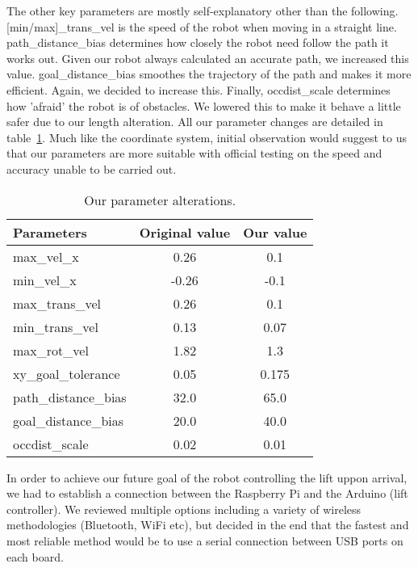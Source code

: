 \documentclass{article}
\begin{document}
The other key parameters are mostly self-explanatory other than the following. [min/max]\_trans\_vel is the speed of the robot when moving in a straight line. path\_distance\_bias determines how closely the robot need follow the path it works out. Given our robot always calculated an accurate path, we increased this value. goal\_distance\_bias smoothes the trajectory of the path and makes it more efficient. Again, we decided to increase this. Finally, occdist\_scale determines how 'afraid' the robot is of obstacles. We lowered this to make it behave a little safer due to our length alteration. All our parameter changes are detailed in table~\ref{tab:params}. Much like the coordinate system, initial observation would suggest to us that our parameters are more suitable with official testing on the speed and accuracy unable to be carried out.

\begin{table}[h]
\vskip 3mm
\begin{center}
\begin{small}
\begin{sc}
\begin{tabular}{lcc}
\hline
\abovespace\belowspace
Parameters & Original value & Our value \\
\hline
  max\_vel\_x & 0.26 & 0.1 \\
  min\_vel\_x & -0.26 & -0.1 \\
  max\_trans\_vel & 0.26 & 0.1 \\
  min\_trans\_vel & 0.13 & 0.07 \\
  max\_rot\_vel & 1.82 & 1.3 \\
  xy\_goal\_tolerance & 0.05 & 0.175 \\
  path\_distance\_bias & 32.0 & 65.0 \\
  goal\_distance\_bias & 20.0 & 40.0 \\
  occdist\_scale & 0.02 & 0.01
\end{tabular}
\end{sc}
\end{small}
\caption{Our parameter alterations.}
\label{tab:params}
\end{center}
\vskip -3mm
\end{table}

In order to achieve our future goal of the robot controlling the lift uppon arrival, we had to establish a connection between the Raspberry Pi and the Arduino (lift controller). We reviewed multiple options including a variety of wireless methodologies (Bluetooth, WiFi etc), but decided in the end that the fastest and most reliable method would be to use a serial connection between USB ports on each board.
\end{document}
